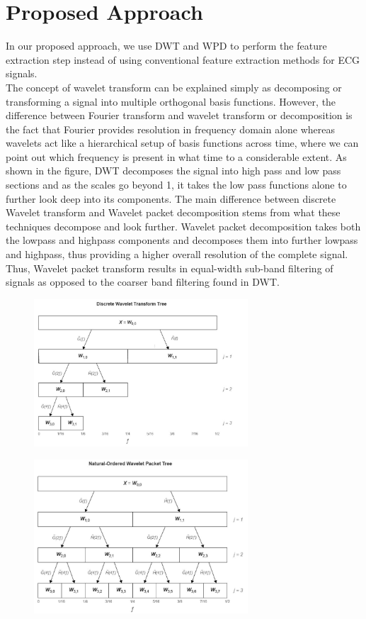 \documentclass[10pt,twocolumn,letterpaper]{article}
\begin{document}
\section{Proposed Approach}

In our proposed approach, we use DWT and WPD to perform the feature extraction step instead of using conventional feature extraction methods for ECG signals.\\
The concept of wavelet transform can be explained simply as decomposing or transforming a signal into multiple orthogonal basis functions. However, the difference between Fourier transform and wavelet transform or decomposition is the fact that Fourier provides resolution in frequency domain alone whereas wavelets act like a hierarchical setup of basis functions across time, where we can point out which frequency is present in what time to a considerable extent. As shown in the figure, DWT decomposes the signal into high pass and low pass sections and as the scales go beyond 1, it takes the low pass functions alone to further look deep into its components. The main difference between discrete Wavelet transform and Wavelet packet decomposition stems from what these techniques decompose and look further. Wavelet packet decomposition takes both the lowpass and highpass components and decomposes them into further lowpass and highpass, thus providing a higher overall resolution of the complete signal. Thus, Wavelet packet transform results in equal-width sub-band filtering of signals as opposed to the coarser band filtering found in DWT.
\begin{figure}[tbp]
\includegraphics[width=8cm]{dwt.JPG}
\end{figure}
\begin{figure}[tbp]
\includegraphics[width=8cm]{wpd.JPG}
\end{figure}
\end{document}
